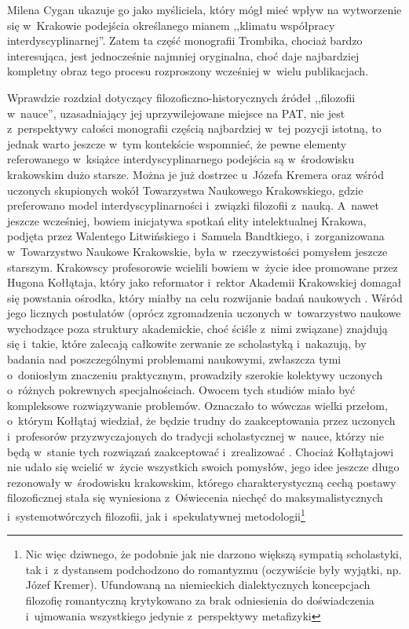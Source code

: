 \begin{newrevplenv}{Milena Cygan}
\parencite{polak_rola_2017} %
  ukazuje go jako myśliciela, który mógł mieć wpływ na wytworzenie się w~Krakowie podejścia określanego mianem ,,klimatu współpracy interdyscyplinarnej''. Zatem ta część monografii Trombika, chociaż bardzo interesująca, jest jednocześnie najmniej oryginalna, choć daje najbardziej kompletny obraz tego procesu rozproszony wcześniej w~wielu publikacjach. 

Wprawdzie rozdział dotyczący filozoficzno-historycznych źródeł ,,filozofii w~nauce'', uzasadniający jej uprzywilejowane miejsce na PAT, nie jest z~perspektywy całości monografii częścią najbardziej w~tej pozycji istotną, to jednak warto jeszcze w~tym kontekście wspomnieć, że pewne elementy referowanego w~książce interdyscyplinarnego podejścia są w~środowisku krakowskim dużo starsze. Można je już dostrzec u~Józefa Kremera 
\parencite[][s.~255]{polak_miedzy_2019} %
 oraz wśród uczonych skupionych wokół Towarzystwa Naukowego Krakowskiego, gdzie preferowano model interdyscyplinarności i~związki filozofii z~nauką. A~nawet jeszcze wcześniej, bowiem inicjatywa spotkań elity intelektualnej Krakowa, podjęta przez Walentego Litwińskiego i~Samuela Bandtkiego, i~zorganizowana w~Towarzystwo Naukowe Krakowskie, była w~rzeczywistości pomysłem jeszcze starszym. Krakowscy profesorowie wcielili bowiem w~życie idee promowane przez Hugona Kołłątaja, który jako reformator i~rektor Akademii Krakowskiej domagał się powstania ośrodka, który miałby na celu rozwijanie badań naukowych 
\parencite[][s.~16]{rederowa_z_1998}. %
 Wśród jego licznych postulatów (oprócz zgromadzenia uczonych w~towarzystwo naukowe wychodzące poza struktury akademickie, choć ściśle z~nimi związane) znajdują się i~takie, które zalecają całkowite zerwanie ze scholastyką i~nakazują, by badania nad poszczególnymi problemami naukowymi, zwłaszcza tymi o~doniosłym znaczeniu praktycznym, prowadziły szerokie kolektywy uczonych o~różnych pokrewnych specjalnościach. Owocem tych studiów miało być kompleksowe rozwiązywanie problemów. Oznaczało to wówczas wielki przełom, o~którym Kołłątaj wiedział, że będzie trudny do zaakceptowania przez uczonych i~profesorów przyzwyczajonych do tradycji scholastycznej w~nauce, którzy nie będą w~stanie tych rozwiązań zaakceptować i~zrealizować 
\parencite[][s.~84]{hinz_refleksja_1962}. %
 Chociaż Kołłątajowi nie udało się wcielić w~życie wszystkich swoich pomysłów, jego idee jeszcze długo rezonowały w~środowisku krakowskim, którego charakterystyczną cechą postawy filozoficznej stała się wyniesiona z~Oświecenia niechęć do maksymalistycznych i~systemotwórczych filozofii, jak i~spekulatywnej metodologii\footnote{Nic więc dziwnego, że podobnie jak nie darzono większą sympatią scholastyki, tak i~z dystansem podchodzono do romantyzmu (oczywiście były wyjątki, np. Józef Kremer). Ufundowaną na niemieckich dialektycznych koncepcjach filozofię romantyczną krytykowano za brak odniesienia do doświadczenia i~ujmowania wszystkiego jedynie z~perspektywy metafizyki 
}
\end{newrevplenv}
